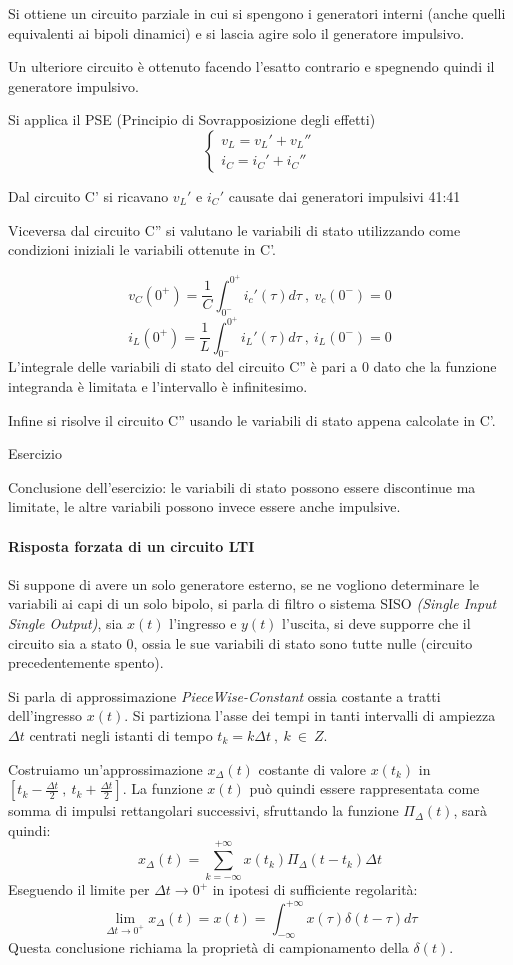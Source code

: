Si ottiene un circuito parziale in cui si spengono i generatori interni (anche quelli equivalenti ai bipoli dinamici) e si lascia agire solo il generatore impulsivo.

Un ulteriore circuito è ottenuto facendo l'esatto contrario e spegnendo quindi il generatore impulsivo.

Si applica il PSE (Principio di Sovrapposizione degli effetti)
$$
\begin{cases}
v_L = v_L' + v_L''\\
i_C = i_C' + i_C''
\end{cases}
$$

Dal circuito C' si ricavano $v_L'$ e $i_C'$ causate dai generatori impulsivi 41:41

Viceversa dal circuito C'' si valutano le variabili di stato utilizzando come condizioni iniziali
le variabili ottenute in C'.

$$
v_C(0^+) = \frac{1}{C} \int_{0^-}^{0^+} i_c'(\tau)d\tau \ , \ v_c(0^-) = 0
$$
$$
i_L(0^+) = \frac{1}{L} \int_{0^-}^{0^+} i_L'(\tau)d\tau \ , \ i_L(0^-) = 0
$$
L'integrale delle variabili di stato del circuito C'' è pari a 0 dato che la funzione integranda è limitata
e l'intervallo è infinitesimo.

Infine si risolve il circuito C'' usando le variabili di stato appena calcolate in C'.

Esercizio 

Conclusione dell'esercizio: le variabili di stato possono essere discontinue ma limitate, le altre
variabili possono invece essere anche impulsive.

\paragraph{Risposta forzata di un circuito LTI}
Si suppone di avere un solo generatore esterno, se ne vogliono determinare le variabili ai capi
di un solo bipolo, si parla di filtro o sistema SISO \textit{(Single Input Single Output)},
sia $x(t)$ l'ingresso e $y(t)$ l'uscita, si deve supporre che il circuito sia a stato 0, ossia
le sue variabili di stato sono tutte nulle (circuito precedentemente spento).

Si parla di approssimazione \textit{PieceWise-Constant} ossia costante a tratti dell'ingresso
$x(t)$.
Si partiziona l'asse dei tempi in tanti intervalli di ampiezza $\Delta t$ centrati negli istanti
di tempo $t_k = k\Delta t\ ,\ k\ \in\ Z$.

Costruiamo un'approssimazione $x_\Delta(t)$ costante di valore $x(t_k)$ in $\left[t_k-\frac{\Delta t}{2}\ ,\ 
t_k+\frac{\Delta t}{2}\right]$.
La funzione $x(t)$ può quindi essere rappresentata come somma di impulsi rettangolari successivi,
sfruttando la funzione $\Pi_{\Delta}(t)$, sarà quindi:
$$
x_{\Delta}(t) = \sum_{k = -\infty}^{+\infty} x(t_k) \Pi_\Delta(t-t_k)\Delta t
$$
Eseguendo il limite per $\Delta t \rightarrow 0^+$ in ipotesi di sufficiente regolarità:
$$
\lim_{\Delta t \to 0^+} x_\Delta(t) = x(t) = \int_{-\infty}^{+\infty} x(\tau) \delta (t-\tau)
d\tau
$$
Questa conclusione richiama la proprietà di campionamento della $\delta(t)$.


